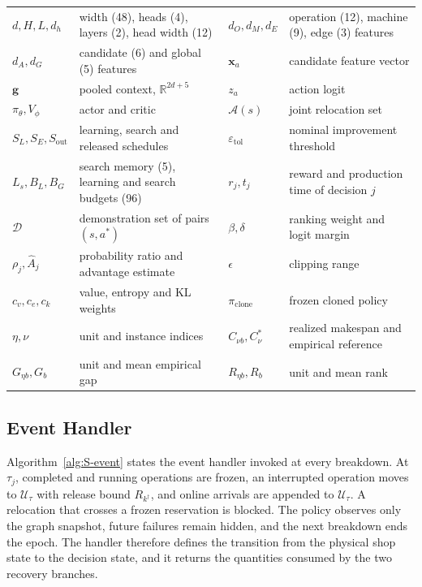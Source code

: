 \documentclass[conference]{IEEEtran}
\theoremstyle{remark}
\newcommand{\cA}{\mathcal{A}}
\newcommand{\cU}{\mathcal{U}}
\newcommand{\cD}{\mathcal{D}}
\begin{document}
\begin{table}[!t]
\begin{tabular}{@{}p{1.75cm}p{6.05cm}p{1.75cm}p{6.05cm}@{}}
$d,H,L,d_h$ & width (48), heads (4), layers (2), head width (12) & $d_O,d_M,d_E$ & operation (12), machine (9), edge (3) features\\
$d_A,d_G$ & candidate (6) and global (5) features & $\bm{x}_a$ & candidate feature vector\\
$\bm{g}$ & pooled context, $\mathbb{R}^{2d+5}$ & $z_a$ & action logit\\
$\pi_\theta,V_\phi$ & actor and critic & $\cA(s)$ & joint relocation set\\
$S_L,S_E,S_{\mathrm{out}}$ & learning, search and released schedules & $\varepsilon_{\mathrm{tol}}$ & nominal improvement threshold\\
$L_s,B_L,B_G$ & search memory (5), learning and search budgets (96) & $r_j,t_j$ & reward and production time of decision $j$\\
$\cD$ & demonstration set of pairs $(s,a^{*})$ & $\beta,\delta$ & ranking weight and logit margin\\
$\rho_j,\hat{A}_j$ & probability ratio and advantage estimate & $\epsilon$ & clipping range\\
$c_v,c_e,c_k$ & value, entropy and KL weights & $\pi_{\mathrm{clone}}$ & frozen cloned policy\\
$\eta,\nu$ & unit and instance indices & $C_{\nu b},C^{*}_{\nu}$ & realized makespan and empirical reference\\
$G_{\eta b},G_b$ & unit and mean empirical gap & $R_{\eta b},R_b$ & unit and mean rank\\
\bottomrule
\end{tabular}
\end{table}

\subsection{Event Handler}
\label{sec:S-events}

Algorithm~\ref{alg:S-event} states the event handler invoked at every breakdown. At $\tau_j$, completed and running operations are frozen, an interrupted operation moves to $\cU_\tau$ with release bound $R_{k^\dagger}$, and online arrivals are appended to $\cU_\tau$. A relocation that crosses a frozen reservation is blocked. The policy observes only the graph snapshot, future failures remain hidden, and the next breakdown ends the epoch. The handler therefore defines the transition from the physical shop state to the decision state, and it returns the quantities consumed by the two recovery branches.
\end{document}
